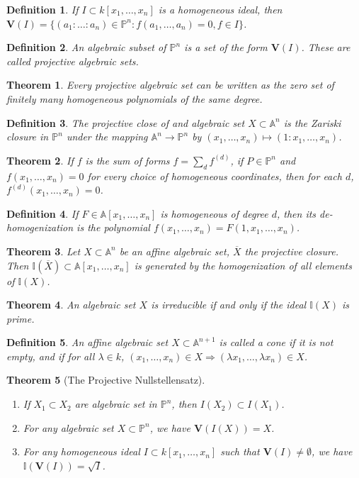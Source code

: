 \documentclass[oneside]{book}
\theoremstyle{mystyle}
\newtheorem{theorem}{Theorem}[section]
\newtheorem{definition}{Definition}[section]
\begin{document}
\begin{definition}
If $I\subset k[x_1,\hdots ,x_n]$ is a homogeneous ideal, then $\mathbf{V}(I) = \{(a_1:\hdots:a_n)\in \mathbb{P}^n:f(a_1,\hdots, a_n) = 0, f\in I\}$.
\end{definition}
\begin{definition}
An algebraic subset of $\mathbb{P}^n$ is a set of the form $\mathbf{V}(I)$. These are called projective algebraic sets.
\end{definition}
\begin{theorem}
Every projective algebraic set can be written as the zero set of finitely many homogeneous polynomials of the same degree.
\end{theorem}
\begin{definition}
The projective close of and algebraic set $X\subset \mathbb{A}^n$ is the Zariski closure in $\mathbb{P}^n$ under the mapping $\mathbb{A}^n \rightarrow \mathbb{P}^n$ by $(x_1,\hdots, x_n) \mapsto (1:x_1,\hdots, x_n)$.
\end{definition}
\begin{theorem}
If $f$ is the sum of forms $f = \sum_{d} f^{(d)}$, if $P\in \mathbb{P}^n$ and $f(x_1,\hdots, x_n) = 0$ for every choice of homogeneous coordinates, then for each $d$, $f^{(d)}(x_1,\hdots, x_n) = 0$.
\end{theorem}
\begin{definition}
If $F\in \mathbb{A}[x_1,\hdots, x_n]$ is homogeneous of degree $d$, then its de-homogenization is the polynomial $f(x_1,\hdots, x_n) = F(1,x_1,\hdots, x_n)$.
\end{definition}
\begin{theorem}
Let $X\subset \mathbb{A}^n$ be an affine algebraic set, $\overline{X}$ the projective closure. Then $\mathbb{I}(\overline{X})\subset \mathbb{A}[x_1,\hdots, x_n]$ is generated by the homogenization of all elements of $\mathbb{I}(X)$.
\end{theorem}
\begin{theorem}
An algebraic set $X$ is irreducible if and only if the ideal $\mathbb{I}(X)$ is prime.
\end{theorem}
\begin{definition}
An affine algebraic set $X\subset \mathbb{A}^{n+1}$ is called a cone if it is not empty, and if for all $\lambda \in k$, $(x_1,\hdots, x_n) \in X \Rightarrow (\lambda x_1,\hdots, \lambda x_n)\in X$.
\end{definition}
\begin{theorem}[The Projective Nullstellensatz]
\
\begin{enumerate}
    \item If $X_1\subset X_2$ are algebraic set in $\mathbb{P}^n$, then $I(X_2)\subset I(X_1)$.
    \item For any algebraic set $X\subset \mathbb{P}^n$, we have $\mathbf{V}(I(X)) = X$.
    \item For any homogeneous ideal $I\subset k[x_1,\hdots ,x_n]$ such that $\mathbf{V}(I)\ne \emptyset$, we have $\mathbb{I}(\mathbf{V}(I)) = \sqrt{I}$.
\end{enumerate}
\end{theorem}
\end{document}
